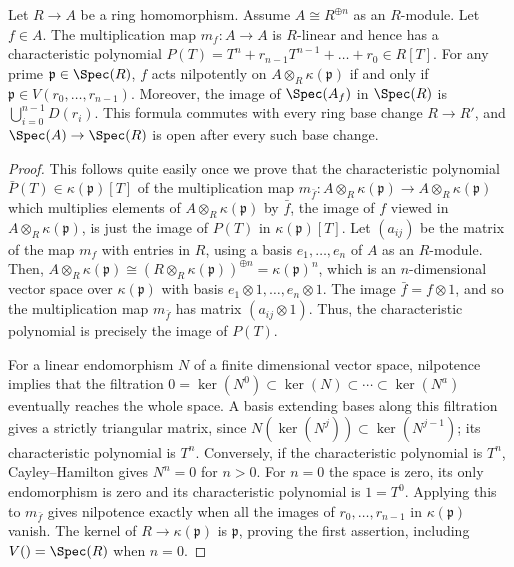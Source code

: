 \begin{lemma}
\label{editorial-source-lemma-characteristic-polynomial-prime}
Let $R \to A$ be a ring homomorphism.
Assume $A \cong R^{\oplus n}$ as an $R$-module.
Let $f \in A$. The multiplication map $m_f: A
\to A$ is $R$-linear and hence
has a characteristic polynomial
$P(T) = T^n + r_{n-1}T^{n-1} + \ldots + r_0 \in R[T]$.
For any prime
$\mathfrak{p} \in \Spec(R)$, $f$ acts nilpotently on $A
\otimes_R \kappa(\mathfrak{p})$ if and only if $\mathfrak p \in
V(r_0, \ldots, r_{n-1})$.
Moreover, the image of $\Spec(A_f)$ in $\Spec(R)$ is
$\bigcup_{i=0}^{n-1}D(r_i)$. This formula commutes with every ring
base change $R\to R'$, and $\Spec(A)\to\Spec(R)$ is open after every
such base change.
\end{lemma}

\begin{proof}
This follows quite easily once we prove that the characteristic
polynomial $\bar P(T) \in \kappa(\mathfrak p)[T]$ of the
multiplication map $m_{\bar f}: A \otimes_R \kappa(\mathfrak p) \to
A \otimes_R \kappa(\mathfrak p)$ which multiplies elements of $A
\otimes_R \kappa(\mathfrak p)$ by $\bar f$, the image of $f$ viewed in
$A\otimes_R\kappa(\mathfrak p)$, is just the image of $P(T)$ in
$\kappa(\mathfrak p)[T]$. Let $(a_{ij})$ be the matrix of the map
$m_f$ with entries in $R$, using a basis $e_1, \ldots, e_n$
of $A$ as an $R$-module.
Then, $A \otimes_R \kappa(\mathfrak p) \cong (R \otimes_R
\kappa(\mathfrak p))^{\oplus n} = \kappa(\mathfrak p)^n$, which is
an $n$-dimensional vector space over $\kappa(\mathfrak p)$ with
basis $e_1 \otimes 1, \ldots, e_n \otimes 1$. The image $\bar f = f
\otimes 1$, and so the multiplication map $m_{\bar f}$ has matrix
$(a_{ij} \otimes 1)$. Thus, the characteristic polynomial is
precisely the image of $P(T)$.

\medskip\noindent
For a linear endomorphism $N$ of a finite dimensional vector space,
nilpotence implies that the filtration
$0=\ker(N^0)\subset\ker(N)\subset\cdots\subset\ker(N^a)$
eventually reaches the whole space. A basis extending bases along this
filtration gives a strictly triangular matrix, since
$N(\ker(N^j))\subset\ker(N^{j-1})$; its characteristic polynomial
is $T^n$. Conversely, if the characteristic polynomial is $T^n$,
Cayley--Hamilton gives $N^n=0$ for $n>0$.
For $n=0$ the space is zero, its only endomorphism is zero and its
characteristic polynomial is $1=T^0$. Applying this to $m_{\bar f}$
gives nilpotence exactly when all the images of
$r_0,\ldots,r_{n-1}$ in $\kappa(\mathfrak p)$ vanish.
The kernel of $R\to\kappa(\mathfrak p)$ is $\mathfrak p$, proving
the first assertion, including $V()=\Spec(R)$ when $n=0$.


\end{proof}
